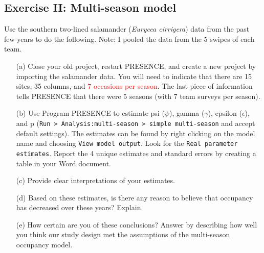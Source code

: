 \documentclass[12pt]{article}\usepackage[]{graphicx}\usepackage[]{color}
\begin{document}
\clearpage

\subsection*{Exercise II: Multi-season model}

Use the southern two-lined salamander ({\it Eurycea cirrigera})
data from the
past few years to do the following. Note: I pooled the data from
the 5 swipes of each team.   

\begin{enumerate}
  \item[(a)] Close your old project, restart PRESENCE, and create a
    new project by importing the salamander
    data. You will need to indicate that there are 15 sites, 35
    columns, and \textcolor{red}{7 occasions per season}. The last piece of
    information tells PRESENCE that there were 5 seasons (with 7 team
    surveys per season).  
  \item[(b)] Use Program PRESENCE to estimate psi ($\psi$), gamma
    ($\gamma$), epsilon ($\epsilon$),
    and p (\texttt{Run > Analysis:multi-season > simple multi-season}
    and accept default settings). The estimates can be found by right clicking on the
    model name and choosing \texttt{View model output}. Look for the 
    \texttt{Real parameter estimates}. Report the 4 unique
    estimates and standard errors by creating a table in your Word
    document.  
  \item[(c)] Provide clear interpretations of your estimates. 
  \item[(d)] Based on these estimates, is there any reason to believe
    that occupancy has decreased over these years? Explain. 
  \item[(e)] How certain are you of these conclusions? Answer by
    describing how well you think our study design met the assumptions
    of the multi-season occupancy model. 

\end{enumerate}
\end{document}
